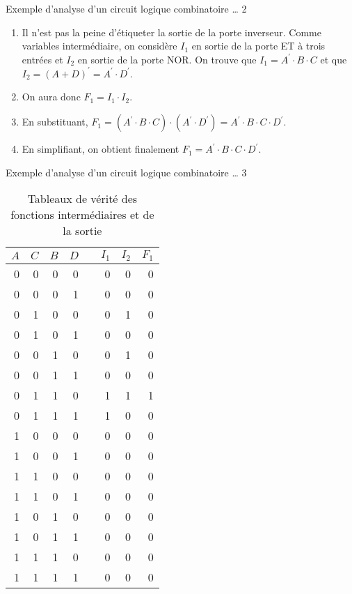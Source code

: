 \documentclass[presentation]{beamer}
\begin{document}
\begin{frame}[label={sec:orgbf8714f}]{Exemple d'analyse d'un circuit logique combinatoire \ldots{} 2}
\begin{enumerate}
\item Il n'est pas la peine d'étiqueter la sortie de la porte
inverseur. Comme variables intermédiaire, on considère \(I_1\)
en sortie de la porte ET à trois entrées et \(I_2\) en sortie de la
porte NOR. On trouve que \(I_1 = A^\prime \cdot B \cdot C\) et que
\(I_2 = (A + D)^\prime = A^\prime \cdot D^\prime\).

\item On aura donc \(F_1 = I_1 \cdot I_2\).

\item En substituant, \(F_1 = ( A^\prime \cdot B \cdot C ) \cdot (
   A^\prime \cdot D^\prime) = A^\prime \cdot B \cdot C \cdot
   D^\prime\).

\item En simplifiant, on obtient finalement \(F_1 = A^\prime \cdot B
   \cdot C \cdot D^\prime\).
\end{enumerate}
\end{frame}

\begin{frame}[label={sec:org586cfb0}]{Exemple d'analyse d'un circuit logique combinatoire \ldots{} 3}
\begin{table}[h] \scriptsize
\caption{\label{tab:org726302a}Tableaux de vérité des fonctions intermédiaires et de la sortie}
\centering
\begin{tabular}{rrrrlrrr}
\(A\) & \(C\) & \(B\) & \(D\) &  & \(I_1\) & \(I_2\) & \(F_1\)\\
\hline
0 & 0 & 0 & 0 &  & 0 & 0 & 0\\
0 & 0 & 0 & 1 &  & 0 & 0 & 0\\
0 & 1 & 0 & 0 &  & 0 & 1 & 0\\
0 & 1 & 0 & 1 &  & 0 & 0 & 0\\
0 & 0 & 1 & 0 &  & 0 & 1 & 0\\
0 & 0 & 1 & 1 &  & 0 & 0 & 0\\
0 & 1 & 1 & 0 &  & 1 & 1 & 1\\
0 & 1 & 1 & 1 &  & 1 & 0 & 0\\
1 & 0 & 0 & 0 &  & 0 & 0 & 0\\
1 & 0 & 0 & 1 &  & 0 & 0 & 0\\
1 & 1 & 0 & 0 &  & 0 & 0 & 0\\
1 & 1 & 0 & 1 &  & 0 & 0 & 0\\
1 & 0 & 1 & 0 &  & 0 & 0 & 0\\
1 & 0 & 1 & 1 &  & 0 & 0 & 0\\
1 & 1 & 1 & 0 &  & 0 & 0 & 0\\
1 & 1 & 1 & 1 &  & 0 & 0 & 0\\
\end{tabular}
\end{table}
\end{frame}
\end{document}
